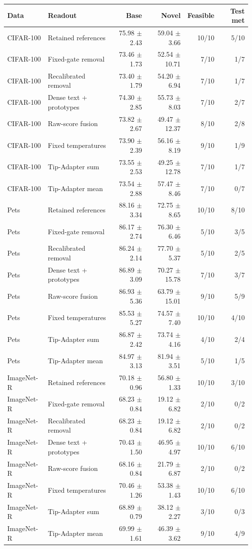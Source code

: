 \begin{tabular}{llrrrr}
\toprule
Data & Readout & Base & Novel & Feasible & Test met \\
\midrule
CIFAR-100 & Retained references & 75.98 $\pm$ 2.43 & 59.04 $\pm$ 3.66 & 10/10 & 5/10 \\
CIFAR-100 & Fixed-gate removal & 73.46 $\pm$ 1.73 & 52.54 $\pm$ 10.71 & 7/10 & 1/7 \\
CIFAR-100 & Recalibrated removal & 73.40 $\pm$ 1.79 & 54.20 $\pm$ 6.94 & 7/10 & 1/7 \\
CIFAR-100 & Dense text + prototypes & 74.30 $\pm$ 2.85 & 55.73 $\pm$ 8.03 & 7/10 & 2/7 \\
CIFAR-100 & Raw-score fusion & 73.82 $\pm$ 2.67 & 49.47 $\pm$ 12.37 & 8/10 & 2/8 \\
CIFAR-100 & Fixed temperatures & 73.90 $\pm$ 2.39 & 56.16 $\pm$ 8.19 & 9/10 & 1/9 \\
CIFAR-100 & Tip-Adapter sum & 73.55 $\pm$ 2.53 & 49.25 $\pm$ 12.78 & 7/10 & 1/7 \\
CIFAR-100 & Tip-Adapter mean & 73.54 $\pm$ 2.88 & 57.47 $\pm$ 8.46 & 7/10 & 0/7 \\
\midrule
Pets & Retained references & 88.16 $\pm$ 3.34 & 72.75 $\pm$ 8.65 & 10/10 & 8/10 \\
Pets & Fixed-gate removal & 86.17 $\pm$ 2.74 & 76.30 $\pm$ 6.46 & 5/10 & 3/5 \\
Pets & Recalibrated removal & 86.24 $\pm$ 2.14 & 77.70 $\pm$ 5.37 & 5/10 & 2/5 \\
Pets & Dense text + prototypes & 86.89 $\pm$ 3.09 & 70.27 $\pm$ 15.78 & 7/10 & 3/7 \\
Pets & Raw-score fusion & 86.93 $\pm$ 5.36 & 63.79 $\pm$ 15.01 & 9/10 & 5/9 \\
Pets & Fixed temperatures & 85.53 $\pm$ 5.27 & 74.57 $\pm$ 7.40 & 10/10 & 4/10 \\
Pets & Tip-Adapter sum & 86.87 $\pm$ 2.42 & 73.74 $\pm$ 4.16 & 4/10 & 2/4 \\
Pets & Tip-Adapter mean & 84.97 $\pm$ 3.13 & 81.94 $\pm$ 3.51 & 5/10 & 1/5 \\
\midrule
ImageNet-R & Retained references & 70.18 $\pm$ 0.96 & 56.80 $\pm$ 1.33 & 10/10 & 3/10 \\
ImageNet-R & Fixed-gate removal & 68.23 $\pm$ 0.84 & 19.12 $\pm$ 6.82 & 2/10 & 0/2 \\
ImageNet-R & Recalibrated removal & 68.23 $\pm$ 0.84 & 19.12 $\pm$ 6.82 & 2/10 & 0/2 \\
ImageNet-R & Dense text + prototypes & 70.43 $\pm$ 1.50 & 46.95 $\pm$ 4.97 & 10/10 & 6/10 \\
ImageNet-R & Raw-score fusion & 68.16 $\pm$ 0.84 & 21.79 $\pm$ 6.87 & 2/10 & 0/2 \\
ImageNet-R & Fixed temperatures & 70.46 $\pm$ 1.26 & 53.38 $\pm$ 1.43 & 10/10 & 6/10 \\
ImageNet-R & Tip-Adapter sum & 68.89 $\pm$ 0.79 & 38.12 $\pm$ 2.27 & 3/10 & 0/3 \\
ImageNet-R & Tip-Adapter mean & 69.99 $\pm$ 1.61 & 46.39 $\pm$ 3.62 & 9/10 & 4/9 \\
\bottomrule
\end{tabular}
